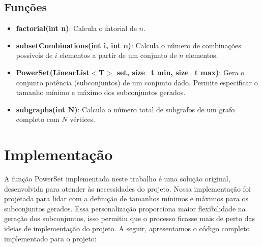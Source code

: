 \documentclass[12pt]{article}
\begin{document}
\subsection{Funções}
\begin{itemize}
    \item \textbf{factorial(int n)}: Calcula o fatorial de \(n\).
    \item \textbf{subsetCombinations(int i, int n)}: Calcula o número de combinações possíveis de \(i\) elementos a partir de um conjunto de \(n\) elementos.
    \item \textbf{PowerSet(LinearList$<$T$>$ set, size\_t min, size\_t max)}: Gera o conjunto potência (subconjuntos) de um conjunto dado. Permite especificar o tamanho mínimo e máximo dos subconjuntos gerados.
    \item \textbf{subgraphs(int N)}: Calcula o número total de subgrafos de um grafo completo com \(N\) vértices.
\end{itemize}

\section{Implementação}
A função PowerSet implementada neste trabalho é uma solução original, desenvolvida para atender às necessidades do projeto. Nossa implementação foi projetada para lidar com a definição de tamanhos mínimos e máximos para os subconjuntos gerados. Essa personalização proporciona maior flexibilidade na geração dos subconjuntos, isso permitiu que o processo ficasse mais de perto das ideias de implementação do projeto. A seguir, apresentamos o código completo implementado para o projeto:
\end{document}
